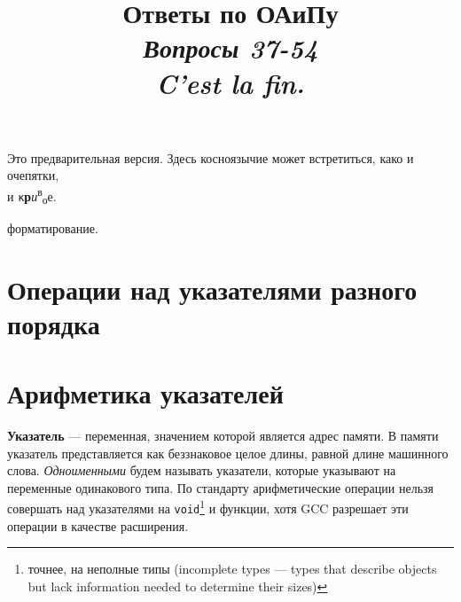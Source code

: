 \documentclass[14pt, a4paper]{extarticle}
\begin{document}
\title{Ответы по ОАиПу \\ {\large \textit{Вопросы 37-54 \\ C'est la fin.}}}
\date{}

\clearpage\maketitle
\thispagestyle{empty}
\vspace{6cm}
\begin{center}
  Это предварительная версия. Здесь косноязычие может встретиться, како и очепятки,
  \\
  \hspace*{12cm} и \verb|к|\textbf{р}\textit{и}\textsuperscript{в}\textsubscript{о}е.
\end{center}
форматирование.

\newcommand{\itembf}[1]{\item \textbf{#1}}

\newpage
\tableofcontents
\newpage

\setcounter{section}{36}

\section{Операции над указателями разного порядка}

\section{Арифметика указателей}
\label{sec:ptr_arithm}
\textbf{Указатель} --- переменная, значением которой является адрес памяти.
В памяти указатель представляется как беззнаковое целое длины, равной длине
машинного слова.
\textit{Одноименными} будем называть указатели, которые указывают на переменные
одинакового типа. По стандарту арифметические операции нельзя совершать над 
указателями на \verb|void|\footnote{точнее, на неполные типы (incomplete types ---
types that describe objects but lack information needed to determine their sizes)}
и функции, хотя GCC разрешает эти операции в качестве расширения.
\end{document}
